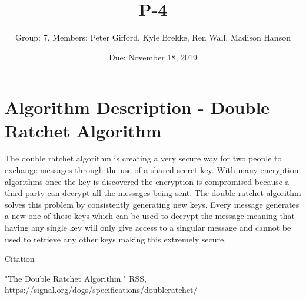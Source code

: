\documentclass{article}
\title{P-4}
\author{Group: 7, Members: Peter Gifford, Kyle Brekke, Ren Wall, Madison Hanson}
\date{Due: November 18, 2019}
\begin{document}
\maketitle

\section{Algorithm Description - Double Ratchet Algorithm}
The double ratchet algorithm is creating a very secure way for two people to exchange messages through the use of a shared secret key. With many encryption algorithms once the key is discovered the encryption is compromised because a third party can decrypt all the messages being sent. The double ratchet algorithm solves this problem by consistently generating new keys. Every message generates a new one of these keys which can be used to decrypt the message meaning that having any single key will only give access to a singular message and cannot be used to retrieve any other keys making this extremely secure.



    
Citation

"The Double Ratchet Algorithm." RSS, https://signal.org/dogs/specifications/doubleratchet/


    
	
	    
\end{document}
